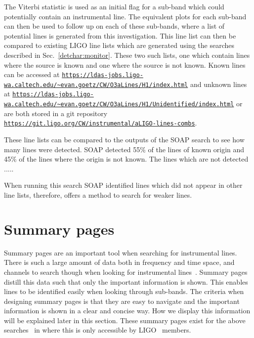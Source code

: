 The Viterbi statistic is used as an initial flag for a sub-band which could potentially contain an instrumental line.
The equivalent plots for each sub-band can then be used to follow up on each of these sub-bands, where a list of potential lines is generated from this investigation. 
This line list can then be compared to existing LIGO line lists which are generated using the searches described in Sec.~\ref{detchar:monitor}.
These two such lists, one which contain lines where the source is known and one where the source is not known.
Known lines can be accessed at {\tt \url{https://ldas-jobs.ligo-wa.caltech.edu/~evan.goetz/CW/O3aLines/H1/index.html}}
and unknown lines at {\tt \url{https://ldas-jobs.ligo-wa.caltech.edu/~evan.goetz/CW/O3aLines/H1/Unidentified/index.html}} or are both stored in a git repository {\tt \url{https://git.ligo.org/CW/instrumental/aLIGO-lines-combs}}. 

These line lists can be compared to the outputs of the SOAP search to see how many lines were detected.
SOAP detected 55\% of the lines of known origin and 45\% of the lines where the origin is not known.
The lines which are not detected .....


When running this search SOAP identified lines which did not appear in other
line lists, therefore, offers a method to search for weaker lines.
~


\clearpage 
\section{\label{detchar:summary}Summary pages}

Summary pages are an important tool when searching for instrumental lines.
There is such a large amount of data both in frequency and time space, and
channels to search though when looking for instrumental lines~. Summary pages
distill this data such that only the important information is shown. This
enables lines to be identified easily when looking through sub-bands. The
criteria when designing summary pages is that they are easy to navigate and the
important information is shown in a clear and concise way.  How we display this
information will be explained later in this section.  These summary pages exist
for the above searches~ in \citep{bayleyHome} where this is only accessible by
\gls{LIGO}~ members.

